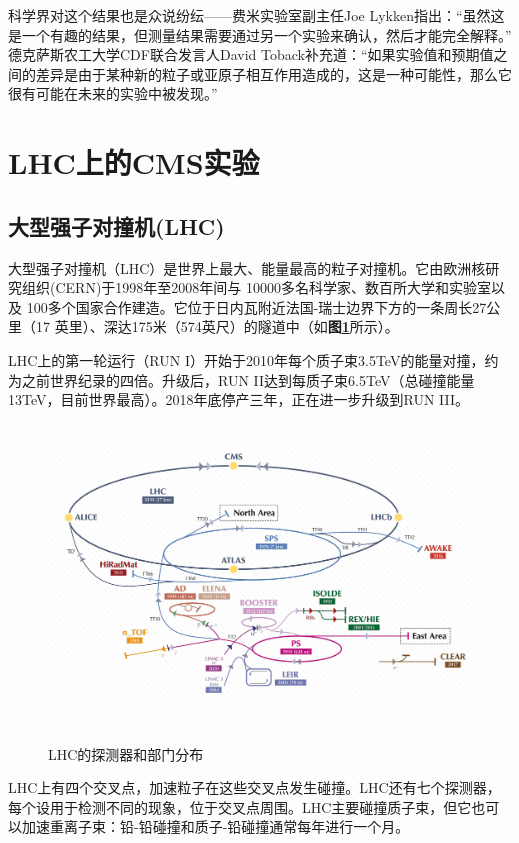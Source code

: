 科学界对这个结果也是众说纷纭——费米实验室副主任Joe Lykken指出：“虽然这是一个有趣的结果，但测量结果需要通过另一个实验来确认，然后才能完全解释。”
德克萨斯农工大学CDF联合发言人David Toback补充道：“如果实验值和预期值之间的差异是由于某种新的粒子或亚原子相互作用造成的，这是一种可能性，那么它很有可能在未来的实验中被发现。”

\section{LHC上的CMS实验}
\subsection{大型强子对撞机(LHC)}
大型强子对撞机（LHC）是世界上最大、能量最高的粒子对撞机。它由欧洲核研究组织(CERN)于1998年至2008年间与 10000多名科学家、数百所大学和实验室以及 100多个国家合作建造。它位于日内瓦附近法国-瑞士边界下方的一条周长27公里（17 英里）、深达175米（574英尺）的隧道中（如\textbf{图\ref{fig:1.4}}所示）。


LHC上的第一轮运行（RUN I）开始于2010年每个质子束3.5TeV的能量对撞，约为之前世界纪录的四倍。升级后，RUN II达到每质子束6.5TeV（总碰撞能量13TeV，目前世界最高）。2018年底停产三年，正在进一步升级到RUN III。

\begin{figure}[H]
 \centering
 \caption{LHC的探测器和部门分布\cite{LHC-complex}}
 \includegraphics[height=8cm, width=14cm]{pictures/CERN_accelerator_complex_(cropped_2).jpeg}
 \label{fig:1.4}
\end{figure}


LHC上有四个交叉点，加速粒子在这些交叉点发生碰撞。LHC还有七个探测器，每个设用于检测不同的现象，位于交叉点周围。LHC主要碰撞质子束，但它也可以加速重离子束：铅-铅碰撞和质子-铅碰撞通常每年进行一个月。

